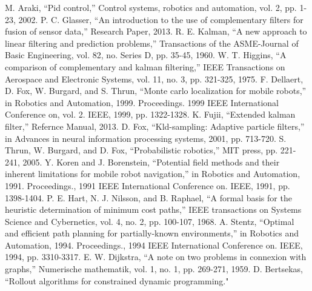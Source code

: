 \documentclass[journal,twoside]{IEEEtran}
\begin{document}
%
%
%
\begin{thebibliography}{1}
\bibitem{}
M. Araki, “Pid control,” Control systems, robotics and automation, vol. 2, pp. 1-23, 2002.
\bibitem{}
P. C. Glasser, “An introduction to the use of complementary filters for fusion of sensor data,” Research Paper, 2013.
\bibitem{}
R. E. Kalman, “A new approach to linear filtering and prediction problems,” Transactions of the ASME-Journal of Basic Engineering, vol. 82, no. Series D, pp. 35-45, 1960.
\bibitem{}
W. T. Higgins, “A comparison of complementary and kalman filtering,” IEEE Transactions on Aerospace and Electronic Systems, vol. 11, no. 3, pp. 321-325, 1975.
\bibitem{}
F. Dellaert, D. Fox, W. Burgard, and S. Thrun, “Monte carlo localization for mobile robots,” in Robotics and Automation, 1999. Proceedings. 1999 IEEE International Conference on, vol. 2. IEEE, 1999, pp. 1322-1328.
\bibitem{}
K. Fujii, “Extended kalman filter,” Refernce Manual, 2013.
\bibitem{}
D. Fox, “Kld-sampling: Adaptive particle filters,” in Advances in neural information processing systems, 2001, pp. 713-720. 
\bibitem{}
S. Thrun, W. Burgard, and D. Fox, “Probabilistic robotics,” MIT press, pp. 221-241, 2005.
\bibitem{}
Y. Koren and J. Borenstein, “Potential field methods and their inherent limitations for mobile robot navigation,” in Robotics and Automation, 1991. Proceedings., 1991 IEEE International Conference on. IEEE, 1991, pp. 1398-1404.
\bibitem{}
P. E. Hart, N. J. Nilsson, and B. Raphael, “A formal basis for the heuristic determination of minimum cost paths,” IEEE transactions on Systems Science and Cybernetics, vol. 4, no. 2, pp. 100-107, 1968.
\bibitem{}
A. Stentz, “Optimal and efficient path planning for partially-known environments,” in Robotics and Automation, 1994. Proceedings., 1994 IEEE International Conference on. IEEE, 1994, pp. 3310-3317.
\bibitem{}
E. W. Dijkstra, “A note on two problems in connexion with graphs,” Numerische mathematik, vol. 1, no. 1, pp. 269-271, 1959.
\bibitem{}
D. Bertsekas, “Rollout algorithms for constrained dynamic programming."
\end{thebibliography}
\end{document}
